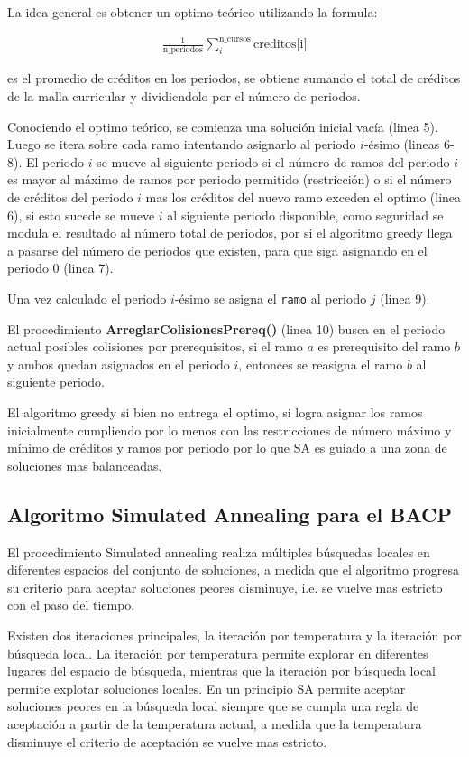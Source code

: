 \documentclass[letterpaper,10pt]{article}
\begin{document}
La idea general es obtener un optimo teórico utilizando la formula:

\begin{align*}
  \frac{1}{\text{n\_periodos}}\sum_{i}^{\text{n\_cursos}} \text{creditos[i]}
\end{align*}

es el promedio de créditos en los periodos, se obtiene sumando el total de créditos de la malla curricular y dividiendolo por el número de periodos.

Conociendo el optimo teórico, se comienza una solución inicial vacía (linea 5). Luego se itera sobre cada ramo intentando asignarlo al periodo $i$-ésimo (lineas 6-8). El periodo $i$ se mueve al siguiente periodo si el número de ramos del periodo $i$ es mayor al máximo de ramos por periodo permitido (restricción) o si el número de créditos del periodo $i$ mas los créditos del nuevo ramo exceden el optimo (linea 6), si esto sucede se mueve $i$ al siguiente periodo disponible, como seguridad se modula el resultado al número total de periodos, por si el algoritmo greedy llega a pasarse del número de periodos que existen, para que siga asignando en el periodo 0 (linea 7).

Una vez calculado el periodo $i$-ésimo se asigna el \texttt{ramo} al periodo $j$ (linea 9).

El procedimiento \textbf{ArreglarColisionesPrereq()} (linea 10) busca en el periodo actual posibles colisiones por prerequisitos, si el ramo $a$ es prerequisito del ramo $b$ y ambos quedan asignados en el periodo $i$, entonces se reasigna el ramo $b$ al siguiente periodo.

El algoritmo greedy si bien no entrega el optimo, si logra asignar los ramos inicialmente cumpliendo por lo menos con las restricciones de número máximo y mínimo de créditos y ramos por periodo por lo que SA es guiado a una zona de soluciones mas balanceadas.

\subsection{Algoritmo Simulated Annealing para el BACP}

El procedimiento Simulated annealing realiza múltiples búsquedas locales en diferentes espacios del conjunto de soluciones, a medida que el algoritmo progresa su criterio para aceptar soluciones peores disminuye, i.e. se vuelve mas estricto con el paso del tiempo.

Existen dos iteraciones principales, la iteración por temperatura y la iteración por búsqueda local. La iteración por temperatura permite explorar en diferentes lugares del espacio de búsqueda, mientras que la iteración por búsqueda local permite explotar soluciones locales. En un principio SA permite aceptar soluciones peores en la búsqueda local siempre que se cumpla una regla de aceptación a partir de la temperatura actual, a medida que la temperatura disminuye el criterio de aceptación se vuelve mas estricto.
\end{document}
